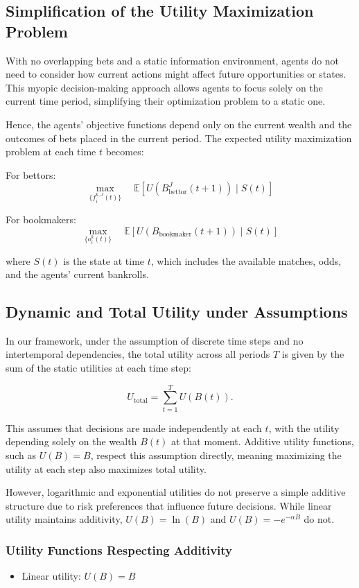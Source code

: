 \subsection{Simplification of the Utility Maximization Problem}

With no overlapping bets and a static information environment, agents do not need to consider how current actions might affect future opportunities or states. This myopic decision-making approach allows agents to focus solely on the current time period, simplifying their optimization problem to a static one.

Hence, the agents' objective functions depend only on the current wealth and the outcomes of bets placed in the current period. The expected utility maximization problem at each time \( t \) becomes:

For bettors:
\[
\max_{\{ f_i^{k,J}(t) \}} \quad \mathbb{E} \left[ U\left( B_{\text{bettor}}^J(t+1) \right) \mid S(t) \right]
\]

For bookmakers:
\[
\max_{\{ o_i^k(t) \}} \quad \mathbb{E} \left[ U\left( B_{\text{bookmaker}}(t+1) \right) \mid S(t) \right]
\]

where \( S(t) \) is the state at time \( t \), which includes the available matches, odds, and the agents' current bankrolls.

\subsection{Dynamic and Total Utility under Assumptions}

In our framework, under the assumption of discrete time steps and no intertemporal dependencies, the total utility across all periods \( T \) is given by the sum of the static utilities at each time step:

\[
U_{\text{total}} = \sum_{t=1}^{T} U(B(t)).
\]

This assumes that decisions are made independently at each \( t \), with the utility depending solely on the wealth \( B(t) \) at that moment. Additive utility functions, such as \( U(B) = B \), respect this assumption directly, meaning maximizing the utility at each step also maximizes total utility.

However, logarithmic and exponential utilities do not preserve a simple additive structure due to risk preferences that influence future decisions. While linear utility maintains additivity, \( U(B) = \ln(B) \) and \( U(B) = -e^{-\alpha B} \) do not.

\subsubsection{Utility Functions Respecting Additivity}
\begin{itemize}
\item Linear utility: \( U(B) = B \)
\end{itemize}

